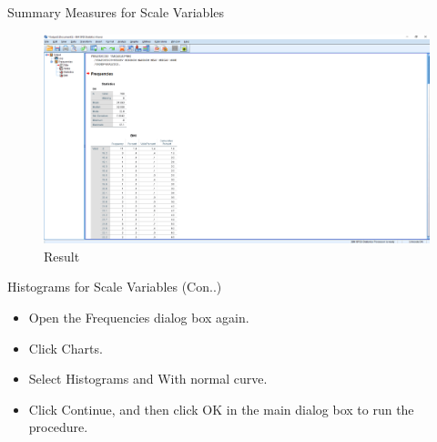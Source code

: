 \begin{frame}[t]{Summary Measures for Scale Variables}
	\begin{figure}
		\centering
		\includegraphics[width=12cm]{img/1111116}
		\caption{Result}
	\end{figure}
\end{frame}



\begin{frame}[t]{Histograms for Scale Variables (Con..)}
	\begin{itemize}
		\item Open the Frequencies dialog box again.	
		\item Click Charts.
		\item Select Histograms and With normal curve.
		\item Click Continue, and then click OK in the main dialog box to run the procedure.
		
	\end{itemize}
\end{frame}

